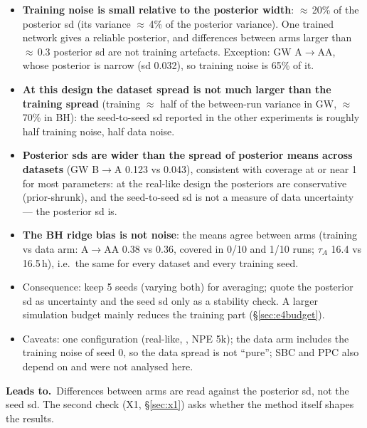 \documentclass[10pt,a4paper]{article}
\newcommand{\tA}{$\tau_A$}
\newcommand{\code}[1]{\texttt{\detokenize{#1}}}
\newcommand{\Leads}[1]{\begin{leadbox}{\sffamily\bfseries\color{caqua!70!black}Leads to.}\ #1\end{leadbox}}
\newcommand{\sref}[1]{\S\ref{#1}}
\begin{document}
\begin{itemize}
\item \textbf{Training noise is small relative to the posterior width}: $\approx$\,20\% of the posterior sd (its variance $\approx$\,4\% of the posterior variance). One trained network gives a reliable posterior, and differences between arms larger than $\approx$\,0.3 posterior sd are not training artefacts. Exception: GW A$\to$AA, whose posterior is narrow (sd 0.032), so training noise is 65\% of it.
\item \textbf{At this design the dataset spread is not much larger than the training spread} (training $\approx$ half of the between-run variance in GW, $\approx$\,70\% in BH): the seed-to-seed sd reported in the other experiments is roughly half training noise, half data noise.
\item \textbf{Posterior sds are wider than the spread of posterior means across datasets} (GW B$\to$A 0.123 vs 0.043), consistent with coverage at or near 1 for most parameters: at the real-like design the posteriors are conservative (prior-shrunk), and the seed-to-seed sd is not a measure of data uncertainty --- the posterior sd is.
\item \textbf{The BH ridge bias is not noise}: the means agree between arms (training vs data arm: A$\to$AA 0.38 vs 0.36, covered in 0/10 and 1/10 runs; \tA{} 16.4 vs 16.5\,h), i.e.\ the same for every dataset and every training seed.
\item Consequence: keep 5 seeds (varying both) for averaging; quote the posterior sd as uncertainty and the seed sd only as a stability check. A larger simulation budget mainly reduces the training part (\S\ref{sec:e4budget}).
\item Caveats: one configuration (real-like, \code{reversible_ab}, NPE 5k); the data arm includes the training noise of seed 0, so the data spread is not ``pure''; SBC and PPC also depend on \code{seed} and were not analysed here.
\end{itemize}
\Leads{Differences between arms are read against the posterior sd, not the seed sd. The second check (X1, \sref{sec:x1}) asks whether the method itself shapes the results.}
\end{document}
